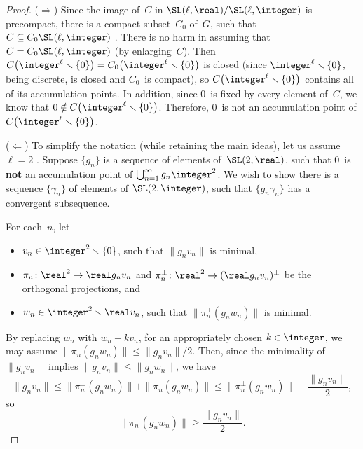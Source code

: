 \begin{proof}
 ($\Rightarrow$)  Since the image of~$C$ in
$\SL(\ell,\real)/\SL(\ell,\integer)$ is precompact, there
is a compact subset~$C_0$ of~$G$, such that $C \subseteq C_0
\SL(\ell,\integer)$ . There is no harm in
assuming that $C = C_0 \SL(\ell,\integer)$ (by enlarging~$C$). Then
 $ C \bigl( \integer^\ell \smallsetminus \{0\} \bigr) 
 = C_0 \bigl( \integer^\ell \smallsetminus \{0\} \bigr) 
 $
 is closed (since $\integer^\ell \smallsetminus \{0\}$,
being discrete, is closed and $C_0$~is compact), so $C
\bigl( \integer^\ell \smallsetminus \{0\} \bigr)$ contains
all of its accumulation points. In addition, since $0$~is
fixed by every element of~$C$, we know that $0 \notin C
\bigl( \integer^\ell \smallsetminus \{0\} \bigr)$.
Therefore, $0$~is not an accumulation point of $C \bigl(
\integer^\ell \smallsetminus \{0\} \bigr)$.

($\Leftarrow$) To simplify the notation (while retaining
the main ideas), let us assume $\ell = 2$
. Suppose $\{g_n\}$ is a sequence
of elements of~$\SL(2,\real)$, such that $0$~is
\textbf{not} an accumulation point of $\bigcup_{n=1}^\infty
g_n \integer^2$. We wish to show there is a
sequence $\{\gamma_n\}$ of elements of $\SL(2,\integer)$,
such that $\{g_n \gamma_n\}$ has a convergent subsequence.

For each~$n$, let 
\noprelistbreak
 \begin{itemize}
 \item $v_n \in \integer^2 \smallsetminus \{0\}$, such
that $\|g_n v_n\|$ is minimal,
 \item $\pi_n \colon \real^2 \to \real g_n v_n$ and
 $\pi_n^\perp \colon \real^2 \to (\real g_n v_n)^\perp$
 be the orthogonal projections, and
 \item $w_n \in \integer^2 \smallsetminus \real v_n$, such
that $\| \pi_n^\perp(g_n w_n)\|$ is minimal. 
 \end{itemize}
 By replacing $w_n$ with $w_n + k v_n$, for an appropriately chosen $k \in
\integer$, we may assume $\|\pi_n(g_n w_n)\| \le \|g_n
v_n\|/2$. Then, since the minimality of $\|g_n v_n\|$ implies
$\| g_n v_n \| \le \| g_n w_n \|$, we have 
 $$ \| g_n v_n \|
 \le \| \pi_n^\perp(g_n w_n)\| + \|\pi_n(g_n w_n)\|
 \le \| \pi_n^\perp(g_n w_n)\| + \frac{\| g_n v_n \|}{2}
,$$
 so
 \begin{equation} \label{LowerBdOnWn}
 \|\pi_n^\perp(g_n w_n)\| \ge \frac{\| g_n v_n \|}{2} .
 \end{equation}


\end{proof}
